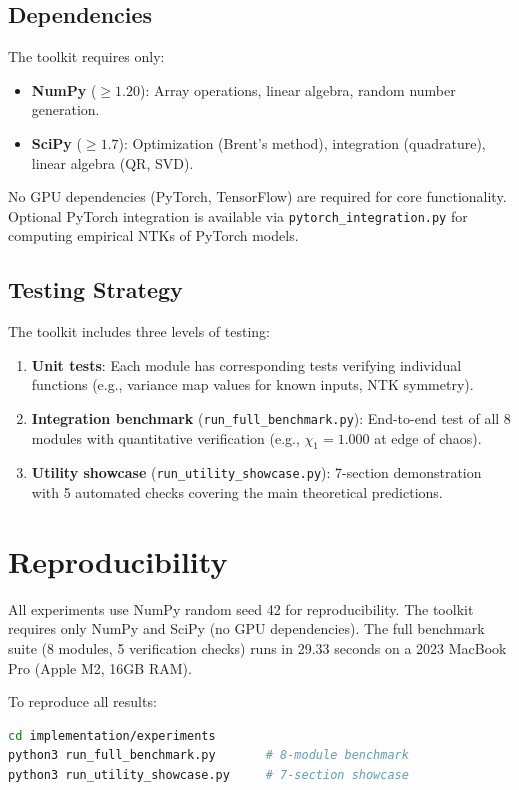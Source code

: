 \documentclass[10pt]{article}
\theoremstyle{definition}
\begin{document}
\subsection{Dependencies}

The toolkit requires only:
\begin{itemize}[nosep]
  \item \textbf{NumPy} ($\geq 1.20$): Array operations, linear algebra, random number generation.
  \item \textbf{SciPy} ($\geq 1.7$): Optimization (Brent's method), integration (quadrature), linear algebra (QR, SVD).
\end{itemize}
No GPU dependencies (PyTorch, TensorFlow) are required for core functionality.
Optional PyTorch integration is available via \texttt{pytorch\_integration.py} for computing empirical NTKs of PyTorch models.

\subsection{Testing Strategy}

The toolkit includes three levels of testing:
\begin{enumerate}[nosep]
  \item \textbf{Unit tests}: Each module has corresponding tests verifying individual functions (e.g., variance map values for known inputs, NTK symmetry).
  \item \textbf{Integration benchmark} (\texttt{run\_full\_benchmark.py}): End-to-end test of all 8 modules with quantitative verification (e.g., $\chi_1 = 1.000$ at edge of chaos).
  \item \textbf{Utility showcase} (\texttt{run\_utility\_showcase.py}): 7-section demonstration with 5 automated checks covering the main theoretical predictions.
\end{enumerate}

\section{Reproducibility}
\label{app:reproducibility}

All experiments use NumPy random seed 42 for reproducibility.
The toolkit requires only NumPy and SciPy (no GPU dependencies).
The full benchmark suite (8 modules, 5 verification checks) runs in 29.33 seconds on a 2023 MacBook Pro (Apple M2, 16GB RAM).

To reproduce all results:
\begin{lstlisting}[language=bash]
cd implementation/experiments
python3 run_full_benchmark.py       # 8-module benchmark
python3 run_utility_showcase.py     # 7-section showcase
\end{lstlisting}
\end{document}
